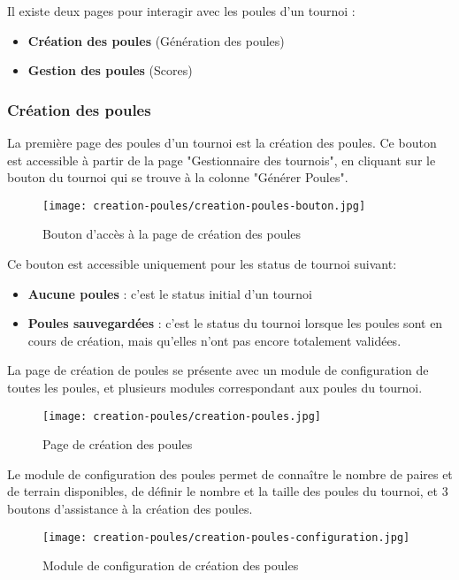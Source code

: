 Il existe deux pages pour interagir avec les poules d'un tournoi :

\begin{itemize}
\item \textbf{Création des poules} (Génération des poules)
\item \textbf{Gestion des poules} (Scores)
\end{itemize}

\subsubsection{Création des poules}

La première page des poules d'un tournoi est la création des poules. Ce bouton est accessible à partir de la page "Gestionnaire des tournois", en cliquant sur le bouton du tournoi qui se trouve à la colonne "Générer Poules".

\begin{figure}[H]
\centering
\texttt{[image: creation-poules/creation-poules-bouton.jpg]}
\caption{Bouton d'accès à la page de création des poules}
\end{figure}

Ce bouton est accessible uniquement pour les status de tournoi suivant:

\begin{itemize}
\item \textbf{Aucune poules} : c'est le status initial d'un tournoi
\item \textbf{Poules sauvegardées} : c'est le status du tournoi lorsque les poules sont en cours de création, mais qu'elles n'ont pas encore totalement validées.
\end{itemize}
\bigskip

La page de création de poules se présente avec un module de configuration de toutes les poules, et plusieurs modules correspondant aux poules du tournoi.

\begin{figure}[H]
\centering
\texttt{[image: creation-poules/creation-poules.jpg]}
\caption{Page de création des poules}
\end{figure}

Le module de configuration des poules permet de connaître le nombre de paires et de terrain disponibles, de définir le nombre et la taille des poules du tournoi, et 3 boutons d'assistance à la création des poules.

\begin{figure}[H]
\centering
\texttt{[image: creation-poules/creation-poules-configuration.jpg]}
\caption{Module de configuration de création des poules}
\end{figure}

